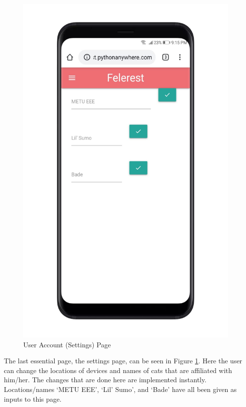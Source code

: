 \begin{figure}[h!] 
     \centering
     \includegraphics[width=.55\linewidth]{content/030_system_architecture/img/user_interface/settings.jpeg}
     \caption{User Account (Settings) Page}
     \label{fig:ui-settings}
\end{figure}

The last essential page, the settings page, can be seen in Figure \ref{fig:ui-settings}. Here the user can change the locations of devices and names of cats that are affiliated with him/her. The changes that are done here are implemented instantly. Locations/names `METU EEE', `Lil' Sumo', and `Bade' have all been given as inputs to this page.

\clearpage
